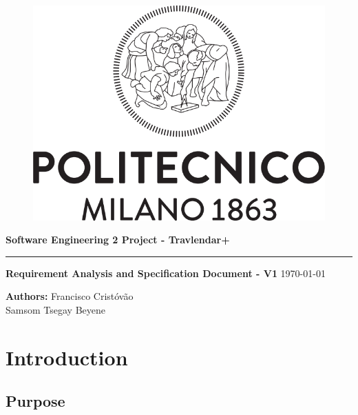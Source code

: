 \documentclass[12pt]{article}
\begin{document}
\begin{titlepage}
    \begin{center}
    \begin{figure}
        \centering
        \includegraphics[scale=0.2]{logoPolimi.png}
        \vspace{1.5cm}
    \end{figure}

    \Huge\textbf{Software Engineering 2 Project - Travlendar+}
    \rule{12cm}{0.5pt}
    \Huge\textbf{Requirement Analysis and Specification Document - V1}
    \today
    \end{center}
    
    \vspace{3cm}
    
    \begin{flushleft}
        \LARGE\textbf{Authors: }
        \newline\newline
        \Large\texttt{}{Francisco Cristóvão \\ Samsom Tsegay Beyene}
    \end{flushleft}



\end{titlepage}

\newpage
  \tableofcontents
\newpage

\section{Introduction}

\subsection{Purpose}
\end{document}
